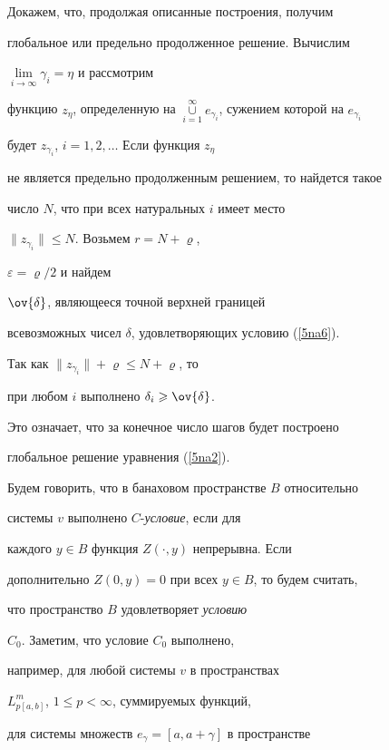 \begin{pf}
Докажем, что, продолжая описанные построения, получим


глобальное или предельно продолженное решение. Вычислим


$\lim\limits_{i\to \infty} \gamma_i=\eta$ и рассмотрим


функцию $z_\eta$, определенную на $\mathop{\cup}\limits_{i=1}^\infty


e_{\gamma_{i}}$, сужением которой на $e_{\gamma_{i}}$


будет $z_{\gamma_{i}}$, $i=1,2,\dotsc$ Если функция $z_\eta$


не является предельно продолженным решением, то найдется такое


число $N$, что при всех натуральных $i$ имеет место


$\| z_{\gamma_{i}}\|\leqslant N$. Возьмем $r=N+\varrho$,


$\varepsilon={\varrho}/{2}$ и найдем


$\ov{\delta}$, являющееся точной верхней границей


всевозможных чисел $\delta$, удовлетворяющих условию (\ref{5na6}).


Так как $\| z_{\gamma_{i}}\|+\varrho\leqslant N+\varrho$, то


при любом $i$ выполнено $\delta_i\geqslant \ov{\delta}$.


Это означает, что за конечное число шагов будет построено


глобальное решение уравнения (\ref{5na2}).


\end{pf}








Будем говорить, что в банаховом пространстве $B$ относительно


системы $v$ выполнено $C$-{\it условие}, если для


каждого $y\in B$ функция $Z(\cdot,y)$ непрерывна. Если


дополнительно $Z(0, y)=0$ при всех $y\in B$, то будем считать,


что пространство $B$ удовлетворяет {\it условию}


$C_0$. Заметим, что условие $C_0$ выполнено,


например, для любой системы $v$ в пространствах


$L^m_{p [a, b]}$, $1\leqslant p<\infty$, суммируемых функций,


для системы множеств $e_\gamma=[a, a+\gamma] $ в пространстве


